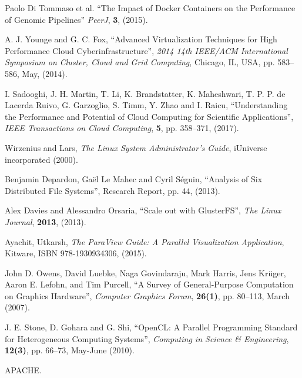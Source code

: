 \documentclass[twoside,a4paper,12pt,english]{inac19}
\begin{document}
\begin{thebibliography}{99}
 Paolo Di Tommaso et al. ``The Impact of Docker Containers on the Performance of Genomic Pipelines'' \textit{PeerJ}, \textbf{3}, (2015).

 A. J. Younge and G. C. Fox, ``Advanced Virtualization Techniques for High Performance Cloud Cyberinfrastructure'', \textit{2014 14th IEEE/ACM International Symposium on Cluster, Cloud and Grid Computing}, Chicago, IL, USA, pp. 583--586, May, (2014).
  
 I. Sadooghi, J. H. Martin, T. Li, K. Brandstatter, K. Maheshwari, T. P. P. de Lacerda Ruivo, G. Garzoglio, S. Timm, Y. Zhao and I. Raicu, ``Understanding the Performance and Potential of Cloud Computing for Scientific Applications'', \textit{IEEE Transactions on Cloud Computing}, \textbf{5}, pp. 358--371, (2017).
  
 Wirzenius and Lars, \textit{The  Linux System Administrator's Guide}, iUniverse incorporated (2000).

 Benjamin Depardon, Ga\"{e}l Le Mahec and Cyril S\'{e}guin, ``Analysis of Six Distributed File Systems'', Research Report, pp. 44, (2013).
  
 Alex Davies and Alessandro Orsaria, ``Scale out with GlusterFS'', \textit{The Linux Journal}, \textbf{2013}, (2013).


 Ayachit, Utkarsh, \textit{The ParaView Guide: A Parallel Visualization Application}, Kitware, ISBN 978-1930934306, (2015).

  John D. Owens, David Luebke, Naga Govindaraju, Mark Harris, Jens Kr\"{u}ger, Aaron E. Lefohn, and Tim Purcell, ``A Survey of General-Purpose Computation on Graphics Hardware'', \textit{Computer Graphics Forum}, \textbf{26(1)}, pp. 80--113, March (2007).

 J. E. Stone, D. Gohara and G. Shi, ``OpenCL: A Parallel Programming Standard for Heterogeneous Computing Systems'', \textit{Computing in Science \& Engineering}, \textbf{12(3)}, pp. 66--73, May-June (2010).

   APACHE.
    
\end{thebibliography}

%
%
\end{document}
